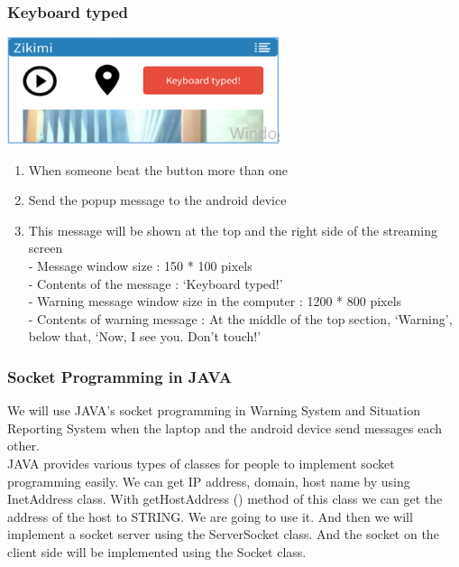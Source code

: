 \documentclass[12pt]{article}
\begin{document}
\subsubsection{Keyboard typed}
\begin{center} 
\includegraphics[width=80mm,scale=1.2]{keyboard}
\end{center}
\begin{enumerate}
\item When someone beat the button more than one\\
\item Send the popup message to the android device\\
\item This message will be shown at the top and the right side of the streaming screen\\
 - Message window size : 150 * 100 pixels\\
 - Contents of the message : ‘Keyboard typed!’\\
 - Warning message window size in the computer : 1200 * 800 pixels\\
- Contents of warning message : At the middle of the top section, ‘Warning’, below that, ‘Now, I see you. Don’t touch!’\\
\end{enumerate}

\subsubsection{Socket Programming in JAVA}
We will use JAVA’s socket programming in Warning System and Situation Reporting System when the laptop and the android device send messages each other.\\
JAVA provides various types of classes for people to implement socket programming easily. We can get IP address, domain, host name by using InetAddress class. With getHostAddress () method of this class we can get the address of the host to STRING. We are going to use it. And then we will implement a socket server using the ServerSocket class. And the socket on the client side will be implemented using the Socket class.\\
\end{document}
